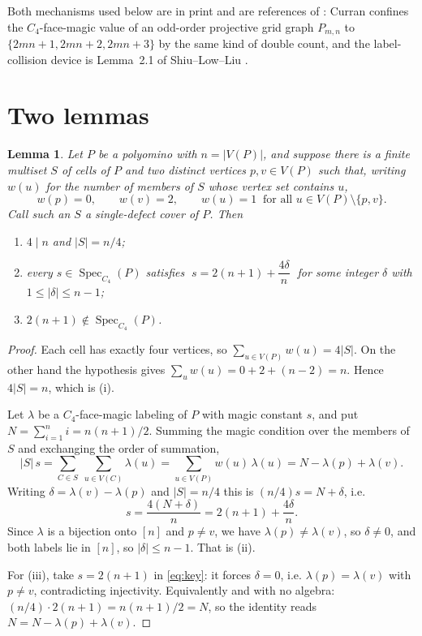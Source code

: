 \documentclass[11pt]{amsart}
\newtheorem{lemma}[theorem]{Lemma}
\DeclareMathOperator{\Spec}{Spec}
\begin{document}
Both mechanisms used below are in print and are references of \cite{CLE}:
Curran \cite[p.~362]{Curran} confines the $C_4$-face-magic value of an
odd-order projective grid graph $P_{m,n}$ to $\{2mn+1,2mn+2,2mn+3\}$ by the
same kind of double count, and the label-collision device is Lemma~2.1 of
Shiu--Low--Liu \cite{SLL}.

\section{Two lemmas}\label{sec:lemmas}

\begin{lemma}\label{lem:cover}
Let $P$ be a polyomino with $n=|V(P)|$, and suppose there is a finite multiset
$S$ of cells of $P$ and two distinct vertices $p,v\in V(P)$ such that, writing
$w(u)$ for the number of members of $S$ whose vertex set contains $u$,
\[
  w(p)=0,\qquad w(v)=2,\qquad w(u)=1\ \text{ for all }u\in V(P)\setminus\{p,v\}.
\]
Call such an $S$ a \emph{single-defect cover} of $P$. Then
\begin{enumerate}
\item[(i)] $4\mid n$ and $|S|=n/4$;
\item[(ii)] every $s\in\Spec_{C_4}(P)$ satisfies
  $\;s=2(n+1)+\dfrac{4\delta}{n}\;$ for some integer $\delta$ with
  $1\le|\delta|\le n-1$;
\item[(iii)] $2(n+1)\notin\Spec_{C_4}(P)$.
\end{enumerate}
\end{lemma}

\begin{proof}
Each cell has exactly four vertices, so
$\sum_{u\in V(P)}w(u)=4|S|$. On the other hand the hypothesis gives
$\sum_{u}w(u)=0+2+(n-2)=n$. Hence $4|S|=n$, which is (i).

Let $\lambda$ be a $C_4$-face-magic labeling of $P$ with magic constant $s$,
and put $N=\sum_{i=1}^{n}i=n(n+1)/2$. Summing the magic condition over the
members of $S$ and exchanging the order of summation,
\[
  |S|\,s
  =\sum_{C\in S}\ \sum_{u\in V(C)}\lambda(u)
  =\sum_{u\in V(P)}w(u)\,\lambda(u)
  =N-\lambda(p)+\lambda(v).
\]
Writing $\delta=\lambda(v)-\lambda(p)$ and $|S|=n/4$ this is
$(n/4)s=N+\delta$, i.e.
\begin{equation}\label{eq:key}
  s=\frac{4(N+\delta)}{n}=2(n+1)+\frac{4\delta}{n}.
\end{equation}
Since $\lambda$ is a bijection onto $[n]$ and $p\ne v$, we have
$\lambda(p)\ne\lambda(v)$, so $\delta\ne0$, and both labels lie in $[n]$, so
$|\delta|\le n-1$. That is (ii).

For (iii), take $s=2(n+1)$ in \eqref{eq:key}: it forces $\delta=0$, i.e.
$\lambda(p)=\lambda(v)$ with $p\ne v$, contradicting injectivity. Equivalently
and with no algebra: $(n/4)\cdot2(n+1)=n(n+1)/2=N$, so the identity reads
$N=N-\lambda(p)+\lambda(v)$.
\end{proof}
\end{document}
